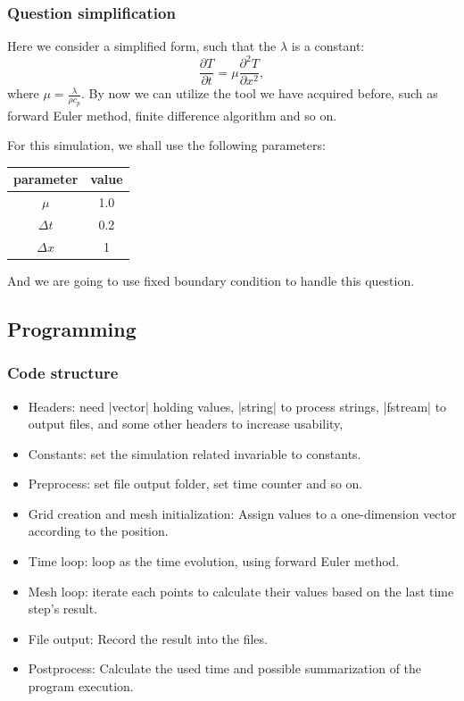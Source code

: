 \documentclass[compress,xcolor={dvipsnames}]{beamer}
\begin{document}
\begin{frame}
    \frametitle{Question simplification}

    Here we consider a simplified form, such that the \(\lambda\) is a constant:
    \[
        \frac{\partial T}{\partial t} = \mu \frac{\partial^2 T}{\partial x^2},
    \]
    where \(\mu = \frac{\lambda}{\rho c_p}\). By now we can utilize the tool we have acquired before, such as forward Euler method, finite difference algorithm and so on.

    For this simulation, we shall use the following parameters:

    \begin{center}
        \begin{tabular}{cc}
            \hline
            parameter    & value \\
            \hline
            \(\mu\)      & 1.0   \\
            \(\Delta t\) & 0.2   \\
            \(\Delta x\) & 1     \\
            \hline
        \end{tabular}
    \end{center}
    And we are going to use fixed boundary condition to handle this question.
\end{frame}

\subsection{Programming}
\begin{frame}[fragile]
    \frametitle{Code structure}

    \begin{itemize}
        \item Headers: need \cverb|vector| holding values, \cverb|string| to process strings, \cverb|fstream| to output files, and some other headers to increase usability,
        \item Constants: set the simulation related invariable to constants.
        \item Preprocess: set file output folder, set time counter and so on.
        \item Grid creation and mesh initialization: Assign values to a one-dimension vector according to the position.
        \item Time loop: loop as the time evolution, using forward Euler method.
        \item Mesh loop: iterate each points to calculate their values based on the last time step's result.
        \item File output: Record the result into the files.
        \item Postprocess: Calculate the used time and possible summarization of the program execution.
    \end{itemize}

\end{frame}
\end{document}
